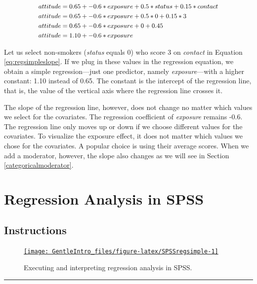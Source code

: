 \documentclass[a4paper]{book}
\theoremstyle{definition}
\theoremstyle{definition}
\theoremstyle{definition}
\theoremstyle{remark}
\begin{document}
\begin{equation}
\small
\begin{split}
  attitude &= 0.65 + -0.6*exposure + 0.5*status + 0.15*contact \\ 
  attitude &= 0.65 + -0.6*exposure + 0.5*0 + 0.15*3 \\ 
  attitude &= 0.65 + -0.6*exposure + 0 + 0.45 \\ 
  attitude &= 1.10 + -0.6*exposure 
\end{split}
  \label{eq:regsimpleslope} 
\normalsize
\end{equation}

Let us select non-smokers (\emph{status} equals 0) who score 3 on
\emph{contact} in Equation \eqref{eq:regsimpleslope}. If we plug in these
values in the regression equation, we obtain a simple regression---just
one predictor, namely \emph{exposure}---with a higher constant: 1.10
instead of 0.65. The constant is the intercept of the regression line,
that is, the value of the vertical axis where the regression line
crosses it.

The slope of the regression line, however, does not change no matter
which values we select for the covariates. The regression coefficient of
\emph{exposure} remains -0.6. The regression line only moves up or down
if we choose different values for the covariates. To visualize the
exposure effect, it does not matter which values we chose for the
covariates. A popular choice is using their average scores. When we add
a moderator, however, the slope also changes as we will see in Section
\ref{categoricalmoderator}.

\section{Regression Analysis in SPSS}\label{SPSS-regression}

\subsection{Instructions}\label{instructions-6}

\begin{figure}[H]
\href{https://www.youtube.com/embed/qgOLWulSERs}{\texttt{[image: GentleIntro\_files/figure-latex/SPSSregsimple-1]} }\caption{Executing and interpreting regression analysis in
SPSS.}\label{fig:SPSSregsimple}
\end{figure}

\begin{center}\rule{0.5\linewidth}{\linethickness}\end{center}
\end{document}
